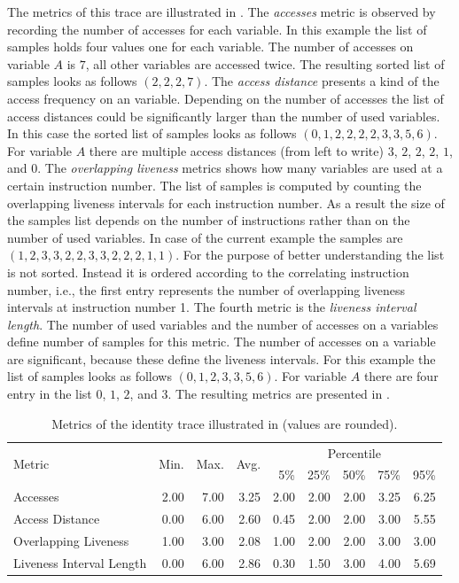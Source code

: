\documentclass[onecolumn, openright, master, english, signatures]{dbrgrptt}
\begin{document}
The metrics of this \ac{trace} are illustrated in .
The \emph{accesses} metric is observed by recording the number of accesses for each variable.
In this example the list of samples holds four values one for each variable.
The number of accesses on variable $A$ is $7$, all other variables are accessed twice.
The resulting sorted list of samples looks as follows $(2, 2, 2, 7)$.
The \emph{access distance} presents a kind of the access frequency on an variable.
Depending on the number of accesses the list of access distances could be significantly larger than the number of used variables.
In this case the sorted list of samples looks as follows $(0, 1, 2, 2, 2, 2, 3, 3, 5, 6)$.
For variable $A$ there are multiple access distances (from left to write) $3$, $2$, $2$, $2$, $1$, and $0$.
The \emph{overlapping liveness} metrics shows how many variables are used at a certain instruction number.
The list of samples is computed by counting the overlapping liveness intervals for each instruction number.
As a result the size of the samples list depends on the number of instructions rather than on the number of used variables.
In case of the current example the samples are $(1, 2, 3, 3, 2, 2, 3, 3, 2, 2, 2, 1, 1)$.
For the purpose of better understanding the list is not sorted.
Instead it is ordered according to the correlating instruction number, i.e., the first entry represents the number of overlapping liveness intervals at instruction number 1.
The fourth metric is the \emph{liveness interval length}.
The number of used variables and the number of accesses on a variables define number of samples for this metric.
The number of accesses on a variable are significant, because these define the liveness intervals.
For this example the list of samples looks as follows $(0, 1, 2, 3, 3, 5, 6)$.
For variable $A$ there are four entry in the list $0$, $1$, $2$, and $3$.
The resulting metrics are presented in .

\begin{table}[!ht]
  \centering
  \begin{tabular}{lrrrrrrrr}
    \hline
    \multirow{2}{*}{Metric} & \multirow{2}{*}{Min.} & \multirow{2}{*}{Max.} & \multirow{2}{*}{Avg.} & \multicolumn{5}{c}{Percentile} \tabularnewline
    & & & & 5\% & 25\% & 50\% & 75\% & 95\% \tabularnewline
    \hline
    Accesses                 & 2.00 & 7.00 & 3.25 & 2.00 & 2.00 & 2.00 & 3.25 & 6.25 \\
    Access Distance          & 0.00 & 6.00 & 2.60 & 0.45 & 2.00 & 2.00 & 3.00 & 5.55 \\
    Overlapping Liveness     & 1.00 & 3.00 & 2.08 & 1.00 & 2.00 & 2.00 & 3.00 & 3.00 \\
    Liveness Interval Length & 0.00 & 6.00 & 2.86 & 0.30 & 1.50 & 3.00 & 4.00 & 5.69 \\
    \hline
  \end{tabular}
  \caption{Metrics of the identity \ac{trace} illustrated in  (values are rounded).}
  \label{tab:summarizing-example-metrics-original}
\end{table}
\end{document}

